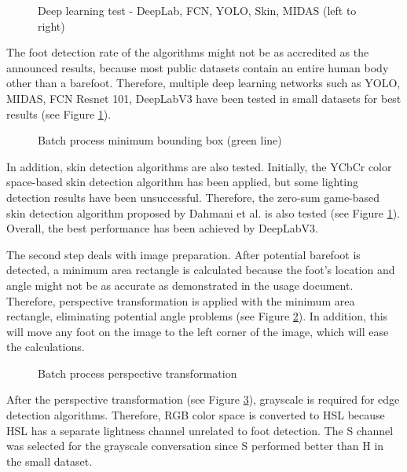 \begin{figure}[htbp]
\centering
{}
\caption{Deep learning test - DeepLab, FCN, YOLO, Skin, MIDAS (left to right)}
\label{fig:DeepLearningTest}
\end{figure}

The foot detection rate of the algorithms might not be as accredited as the announced results, because most public datasets contain an entire human body other than a barefoot. Therefore, multiple deep learning networks such as YOLO, MIDAS, FCN Resnet 101, DeepLabV3 have been tested in small datasets for best results (see Figure \ref{fig:DeepLearningTest}).

\begin{figure}[htbp]
\centering
{}
\caption{Batch process minimum bounding box (green line)}
\label{fig:BatchProcessMinimumBoundingBox}
\end{figure}

In addition, skin detection algorithms are also tested. Initially, the YCbCr color space-based skin detection algorithm has been applied, but some lighting detection results have been unsuccessful. Therefore, the zero-sum game-based skin detection algorithm proposed by Dahmani et al. \cite{dahmani2020zero} is also tested (see Figure \ref{fig:DeepLearningTest}). Overall, the best performance has been achieved by DeepLabV3.

The second step deals with image preparation. After  potential barefoot is detected, a minimum area rectangle is calculated because the foot's location and angle might not be as accurate as demonstrated in the usage document. Therefore, perspective transformation is applied with the minimum area rectangle, eliminating potential angle problems (see Figure \ref{fig:BatchProcessMinimumBoundingBox}). In addition, this will move any foot on the image to the left corner of the image, which will ease the calculations.

\begin{figure}[htbp]
\centering
{}
\caption{Batch process perspective transformation}
\label{fig:BatchProcessPerspectiveTransformation}
\end{figure}

After the perspective transformation (see Figure \ref{fig:BatchProcessPerspectiveTransformation}), grayscale is required for edge detection algorithms. Therefore, RGB color space is converted to HSL because HSL has a separate lightness channel unrelated to foot detection. The S channel was selected for the grayscale conversation since S performed better than H in the small dataset.

